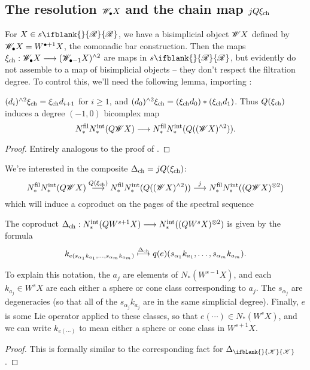\documentclass[10pt]{article}
\newcommand{\PRLie}[1]%
{\ifblank{#1}{\scrR}{\scrR^{#1}}}
\newcommand{\LL}[1]{\ifblank{#1}{\scrK}{\scrK^{#1}}}
\renewcommand{\Q}{Q}
\begin{document}
\begin{backgroundOnMultiplicativity}
\subsection{The resolution $\scrW_\bullet X$ and the chain map $j\circ Q\xi_\textup{ch}$}
For $X\in s\PRLie{}$, we have a bisimplicial object $\scrW X$ defined by $\scrW_\bullet X=W^{\bullet+1} X$, the comonadic bar construction. Then the maps $\xi_\textup{ch}:\scrW_\bullet X\to (\scrW_{\bullet-1} X)^{\wedge 2}$ are maps in $s\PRLie{}$, but evidently do not assemble to a map of bisimplicial objects -- they don't respect the filtration degree. To control this, we'll need the following lemma, importing \cite[lemma 5.5]{MR1089001}:
\begin{lem}
$(d_i)^{\wedge 2}\xi_\textup{ch}=\xi_\textup{ch}d_{i+1}$ for $i\geq1$, and $(d_0)^{\wedge 2}\xi_\textup{ch}=(\xi_\textup{ch}d_{0})*(\xi_\textup{ch}d_{1})$. Thus $\Q(\xi_\textup{ch})$ induces a degree $(-1,0)$ bicomplex map 
\[N_*^\textup{fil}N_*^\textup{int}(\Q\scrW X)\to N_*^\textup{fil}N_*^\textup{int}(\Q((\scrW X)^{\wedge 2})).\]
\end{lem}
\begin{proof}
Entirely analogous to the proof of \cite[lemma 5.5]{MR1089001}.
\end{proof}
We're interested in the composite $\Delta_\textup{ch}=j\circ Q(\xi_\textup{ch})$:
\[N_*^\textup{fil}N_*^\textup{int}(\Q\scrW X)\overset{\Q(\xi_\textup{ch})}{\to} N_*^\textup{fil}N_*^\textup{int}(\Q((\scrW X)^{\wedge 2}))\overset{j}{\to} N_*^\textup{fil}N_*^\textup{int}((\Q\scrW X)^{\otimes 2})\]
which will induce a coproduct on the pages of the spectral sequence
\begin{prop}
The coproduct $\Delta_\textup{ch}:N_*^\textup{int}(QW^{s+1}X)\to N_*^\textup{int}((QW^{s}X)^{\otimes2})$ is given by the formula
\[k_{e(s_{\alpha_1}k_{a_1},\ldots,s_{\alpha_m}k_{a_m})}\overset{\Delta_\textup{ch}}{\mapsto}q(e)(s_{\alpha_1}k_{a_1},\ldots,s_{\alpha_m}k_{a_m}).\]
\end{prop}
To explain this notation, the $a_j$ are elements of $N_*(W^{s-1}X)$, and each $k_{a_j}\in W^sX$ are each either a sphere or cone class corresponding to $a_j$. The $s_{\alpha_j}$ are degeneracies (so that all of the $s_{\alpha_j}k_{a_j}$ are in the same simplicial degree). Finally, $e$ is some Lie operator applied to these classes, so that $e(\cdots )\in N_*(W^sX)$, and we can write $k_{e(\cdots )}$ to mean either a sphere or cone class in $W^{s+1}X$.
\begin{proof}
This is formally similar to the corresponding fact for $\Delta_{\LL{}}$.
\end{proof}

\end{backgroundOnMultiplicativity}
\end{document}
